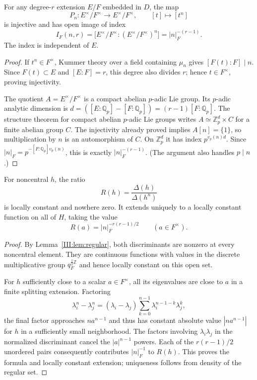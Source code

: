 \begin{lemma}\label{III:lem:index}
For any degree-$r$ extension $E/F$ embedded in $D$, the map
\[
P_n:E^\times/F^\times\longrightarrow E^\times/F^\times,\qquad [t]\longmapsto[t^n]
\]
is injective and has open image of index
\begin{equation}\label{III:eq:index}
I_F(n,r)=\bigl[E^\times/F^\times:(E^\times/F^\times)^n\bigr]
=|n|_F^{-(r-1)}.
\end{equation}
The index is independent of $E$.
\end{lemma}
\begin{proof}
If $t^n\in F^\times$, Kummer theory over a field containing $\mu_n$ gives $[F(t):F]\mid n$. Since $F(t)\subset E$ and $[E:F]=r$, this degree also divides $r$; hence $t\in F^\times$, proving injectivity.

The quotient $A=E^\times/F^\times$ is a compact abelian $p$-adic Lie group. Its $p$-adic analytic dimension is $d=([E:\mathbb Q_p]-[F:\mathbb Q_p])=(r-1)[F:\mathbb Q_p]$. The structure theorem for compact abelian $p$-adic Lie groups writes $A\simeq \mathbb Z_p^d\times C$ for a finite abelian group $C$. The injectivity already proved implies $A[n]=\{1\}$, so multiplication by $n$ is an automorphism of $C$. On $\mathbb Z_p^d$ it has index $p^{v_p(n)d}$. Since $|n|_F=p^{-[F:\mathbb Q_p]v_p(n)}$, this is exactly $|n|_F^{-(r-1)}$. (The argument also handles $p\mid n$.)
\end{proof}

\begin{lemma}\label{III:lem:ratio}
For noncentral $h$, the ratio
\[
R(h)=\frac{\Delta(h)}{\Delta(h^n)}
\]
is locally constant and nowhere zero. It extends uniquely to a locally constant function on all of $H$, taking the value
\begin{equation}\label{III:eq:ratio-at-center}
R(a)=|n|_F^{-r(r-1)/2}\qquad(a\in F^\times).
\end{equation}
\end{lemma}
\begin{proof}
By Lemma~\ref{III:lem:regular}, both discriminants are nonzero at every noncentral element. They are continuous functions with values in the discrete multiplicative group $q_F^{\frac12\mathbb Z}$ and hence locally constant on this open set.

For $h$ sufficiently close to a scalar $a\in F^\times$, all its eigenvalues are close to $a$ in a finite splitting extension. Factoring
\[
\lambda_i^n-\lambda_j^n=(\lambda_i-\lambda_j)
\sum_{k=0}^{n-1}\lambda_i^{n-1-k}\lambda_j^k,
\]
the final factor approaches $na^{n-1}$ and thus has constant absolute value $|na^{n-1}|$ for $h$ in a sufficiently small neighborhood. The factors involving $\lambda_i\lambda_j$ in the normalized discriminant cancel the $|a|^{n-1}$ powers. Each of the $r(r-1)/2$ unordered pairs consequently contributes $|n|_F^{-1}$ to $R(h)$. This proves the formula and locally constant extension; uniqueness follows from density of the regular set.
\end{proof}

